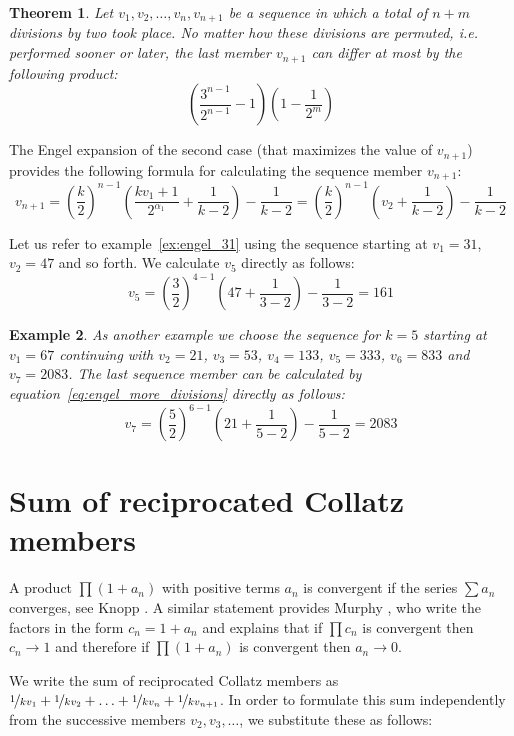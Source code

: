 \documentclass[12pt]{amsart}
\newtheorem{theorem}{Theorem}[section]
\newtheorem{example}[theorem]{Example}
\theoremstyle{definition}
\begin{document}
\par\medskip
\begin{theorem}
	\label{theo:permutation}
	Let $v_1,v_2,\ldots,v_n,v_{n+1}$ be a sequence in which a total of $n+m$ divisions by two took place. No matter how these divisions are permuted, i.e. performed sooner or later, the last member $v_{n+1}$ can differ at most by the following product:
	\[
	\left(\frac{3^{n-1}}{2^{n-1}}-1\right)\left(1-\frac{1}{2^m}\right)
	\]
\end{theorem}

The Engel expansion of the second case (that maximizes the value of $v_{n+1}$) provides the following formula for calculating the sequence member $v_{n+1}$:
\begin{equation}
\label{eq:engel_more_divisions}
v_{n+1}=\left(\frac{k}{2}\right)^{n-1}\left(\frac{kv_1+1}{2^{\alpha_1}}+\frac{1}{k-2}\right)-\frac{1}{k-2}=\left(\frac{k}{2}\right)^{n-1}\left(v_2+\frac{1}{k-2}\right)-\frac{1}{k-2}
\end{equation}

Let us refer to example~\ref{ex:engel_31} using the sequence starting at $v_1=31$, $v_2=47$ and so forth. We calculate $v_5$ directly as follows:
\[
v_5=\left(\frac{3}{2}\right)^{4-1}\left(47+\frac{1}{3-2}\right)-\frac{1}{3-2}=161
\]

\begin{example}
\label{ex:engel_67}
As another example we choose the sequence for $k=5$ starting at $v_1=67$ continuing with $v_2=21$, $v_3=53$, $v_4=133$, $v_5=333$, $v_6=833$ and $v_7=2083$. The last sequence member can be calculated by equation~\ref{eq:engel_more_divisions} directly as follows:
\[
v_7=\left(\frac{5}{2}\right)^{6-1}\left(21+\frac{1}{5-2}\right)-\frac{1}{5-2}=2083
\]
\end{example}

\section{Sum of reciprocated Collatz members}
\label{sum_reciprocal_vertices}
A product $\prod(1+a_n)$ with positive terms $a_n$ is convergent if the series $\sum a_n$ converges, see Knopp \cite[p.~220]{Ref_Knopp}. A similar statement provides Murphy \cite{Ref_Murphy}, who write the factors in the form $c_n=1+a_n$ and explains that if $\prod c_n$ is convergent then $c_n\rightarrow1$ and therefore if $\prod (1+a_n)$ is convergent then $a_n\rightarrow0$.

\par\medskip
We write the sum of reciprocated Collatz members as $\nicefrac{1}{kv_1}+\nicefrac{1}{kv_2}+\ldots+\nicefrac{1}{kv_n}+\nicefrac{1}{kv_{n+1}}$. In order to formulate this sum independently from the successive members $v_2,v_3,\ldots$, we substitute these as follows:
\end{document}
